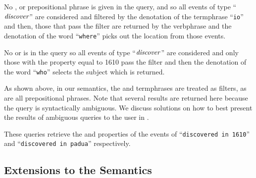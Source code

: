 \documentclass[../main.tex]{subfiles}
\begin{document}
\begin{refsection}
\examplespacing


\examplespacing

\noindent No , or prepositional phrase is given in the query, and so all events of type ``$\operatorname{\mathit{discover}}$'' are considered and filtered by the denotation of the  termphrase ``\texttt{io}'' and then, those that pass the filter are returned by the verbphrase and the denotation of the word ``\texttt{where}'' picks out the location from those events. %

\examplespacing


\examplespacing

\noindent No  or  is in the query so all events of type ``$\operatorname{\mathit{discover}}$'' are considered and only those with the  property equal to 1610 pass the filter and then the denotation of the word ``\texttt{who}'' selects the subject which is returned.

\examplespacing


\examplespacing

\noindent As shown above, in our semantics, the  and  termphrases are treated as filters, as are all prepositional phrases. Note that several results are returned here because the query is syntactically ambiguous.  We discuss solutions on how to best present the results of ambiguous queries to the user in .

\examplespacing



\noindent These queries retrieve the  and  properties of the events of ``\texttt{discovered in 1610}'' and ``\texttt{discovered in padua}'' respectively.

\subsection{Extensions to the Semantics}
\label{webist2019journal:extend}


\end{refsection}
\end{document}

